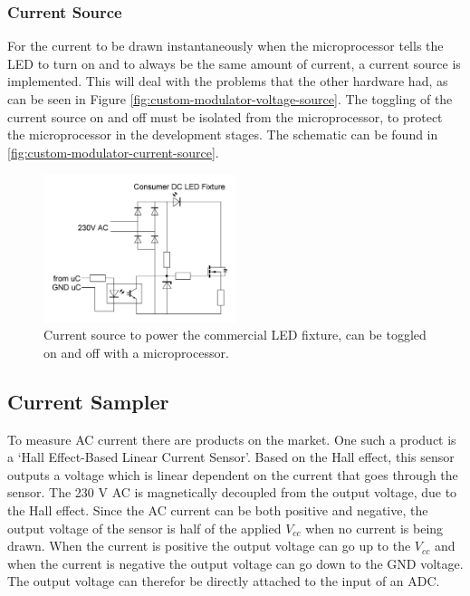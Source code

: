 


	\subsubsection{Current Source}

	For the current to be drawn instantaneously when the microprocessor tells the LED to turn on and to always be the same amount of current, a current source is implemented. 
	This will deal with the problems that the other hardware had, as can be seen in Figure \ref{fig:custom-modulator-voltage-source}.
	The toggling of the current source on and off must be isolated from the microprocessor, to protect the microprocessor in the development stages.
	The schematic can be found in \autoref{fig:custom-modulator-current-source}.


	\begin{figure}[htb]
		\centering
		\includegraphics[angle=0,width=0.5\textwidth,keepaspectratio]{chapters/hardware-chapters/custom-modulator-current-source.JPG}
		\caption{Current source to power the commercial LED fixture, can be toggled on and off with a microprocessor.}
		\label{fig:custom-modulator-current-source}
	\end{figure}


\subsection{Current Sampler}

To measure AC current there are products on the market.
One such a product is a `Hall Effect-Based Linear Current Sensor'.
Based on the Hall effect, this sensor outputs a voltage which is linear dependent on the current that goes through the sensor.
The 230 V AC is magnetically decoupled from the output voltage, due to the Hall effect.
Since the AC current can be both positive and negative, the output voltage of the sensor is half of the applied $V_{cc}$ when no current is being drawn.
When the current is positive the output voltage can go up to the $V_{cc}$ and when the current is negative the output voltage can go down to the GND voltage. 
The output voltage can therefor be directly attached to the input of an ADC.


